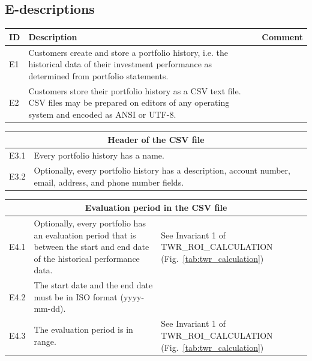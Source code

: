 \documentclass[runningheads,12pt]{article}
\begin{document}
\subsection{E-descriptions}

{\centering
\begin{longtable}{|l|p{9cm}|p{5cm}|}
\hline
\textbf{ID} & \textbf{Description} & \textbf{Comment}\\

\hline
E1 & Customers create and store a portfolio history, i.e. the historical data of their investment performance as determined from portfolio statements. & \\

\hline
E2 & Customers store their portfolio history as a CSV text file. CSV files may be prepared on editors of any operating system and encoded as ANSI or UTF-8. & \\

\hline
\end{longtable}


\centering
\begin{longtable}{|l|p{9cm}|p{5cm}|}

\hline
\multicolumn{3}{|c|}{\textbf{Header of the CSV file}} \\


\hline
E3.1 & Every portfolio history has a name. & \\

\hline
E3.2 & Optionally, every portfolio history has a description, account number, email, address, and phone number fields. & \\

\hline
\end{longtable}

\centering
\begin{longtable}{|l|p{9cm}|p{5cm}|}

\hline
\multicolumn{3}{|c|}{\textbf{Evaluation period in the CSV file}} \\

\hline
E4.1 & Optionally, every portfolio has an evaluation period that is between the start and end date of the historical performance data. & See Invariant 1 of TWR\_ROI\_CALCULATION (Fig.~\ref{tab:twr_calculation})\\

\hline
E4.2 & The start date and the end date must be in ISO format (yyyy-mm-dd). & \\

\hline
E4.3 & The evaluation period is in range. & See Invariant 1 of TWR\_ROI\_CALCULATION (Fig.~\ref{tab:twr_calculation})\\


\end{longtable}}
\end{document}
